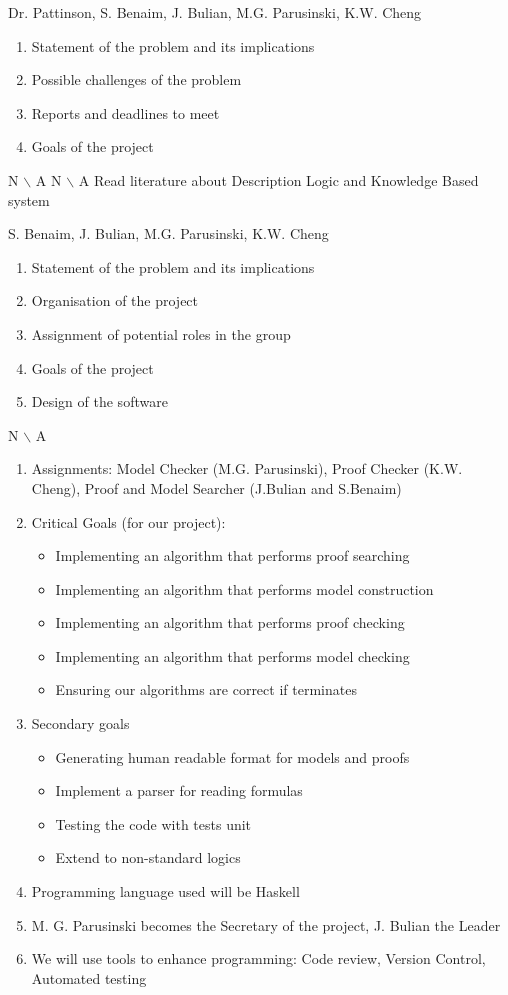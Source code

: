 %
{Dr. Pattinson, S. Benaim, J. Bulian, M.G. Parusinski, K.W. Cheng}%
{ \begin{enumerate} \item Statement of the problem and its implications 
 \item Possible challenges of the problem 
 \item Reports and deadlines to meet 
 \item Goals of the project 
\end{enumerate} }%
{ N $\backslash$ A}%
{ N $\backslash$ A}%
{ Read literature about Description Logic and Knowledge Based system}

%
{S. Benaim, J. Bulian, M.G. Parusinski, K.W. Cheng}%
{ \begin{enumerate} \item Statement of the problem and its implications 
 \item Organisation of the project 
 \item Assignment of potential roles in the group
 \item Goals of the project
 \item Design of the software 
\end{enumerate} }%
{N $\backslash$ A}
{ \begin{enumerate}
\item Assignments: Model Checker (M.G. Parusinski), Proof Checker (K.W. Cheng),
Proof and Model Searcher (J.Bulian and S.Benaim)
\item Critical Goals (for our project):
\begin{itemize}
\item Implementing an algorithm that performs proof searching
\item Implementing an algorithm that performs model construction
\item Implementing an algorithm that performs proof checking
\item Implementing an algorithm that performs model checking
\item Ensuring our algorithms are correct if terminates
\end{itemize}
\item Secondary goals \begin{itemize}
\item Generating human readable format for models and proofs
\item Implement a parser for reading formulas
\item Testing the code with tests unit
\item Extend to non-standard logics
\end{itemize}
\item Programming language used will be Haskell
\item M. G. Parusinski becomes the Secretary of the project, J. Bulian the Leader
\item We will use tools to enhance programming: Code review, Version Control, Automated testing
\end{enumerate} }%
